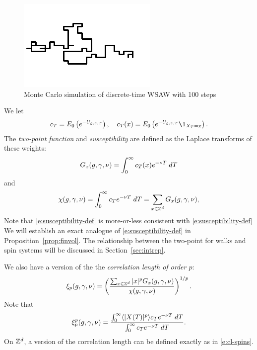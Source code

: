 \begin{figure}[!htb]
\centering
\label{fig:domb-joyce}
\includegraphics{domb-joyce-black-small.png}
\caption[Discrete WSAW]{Monte Carlo simulation of discrete-time WSAW with 100 steps}
\end{figure}

We let
\begin{equation}
\label{e:c}
c_T = E_0\left(e^{-U_{\gcc,\gamma,T}}\right),
	\quad
c_T(x) = E_0\left(e^{-U_{\gcc,\gamma,T}}\1_{X_T = x}\right).
\end{equation}
The \emph{two-point function} and \emph{susceptibility} are defined
as the Laplace transforms of these weights:
\begin{equation}
\lbeq{Gsa}
G_x(\gcc,\gamma,\nu)
    =
\int_0^\infty c_T(x) e^{-\nu T} \; dT
\end{equation}
and
\begin{equation}
\label{e:suscept-def}
\chi(g, \gamma, \nu)
	=
\int_0^\infty c_T e^{-\nu T} \; dT
	=
\sum_{x\in{ {{\mathbb Z}}^d }} G_x(g,\gamma,\nu),
\end{equation}
Note that \eqref{e:susceptibility-def} is more-or-less consistent with \eqref{e:susceptibility-def}
We will establish an exact analogue of \eqref{e:susceptibility-def} in Proposition~\ref{prop:finvol}.
The relationship between the two-point for walks and spin systems will be
discussed in Section~\ref{sec:intrep}.

We also have a version of the the \emph{correlation length of order $p$}:
\begin{equation}
\label{e:clp-wsawsa}
\xi_p(g, \gamma, \nu)
	=
\left(\frac{\sum_{x\in{ {{\mathbb Z}}^d }} |x|^p G_x(g, \gamma, \nu)}{\chi(g, \gamma, \nu)}\right)^{1/p}.
\end{equation}
Note that
\begin{equation}
\xi_p^p(g,\gamma,\nu)
	=
\frac
{\int_0^\infty \langle |X(T)|^p \rangle c_T e^{-\nu T} \; dT}
{\int_0^\infty c_T e^{-\nu T} \; dT}.
\end{equation}
On ${ {{\mathbb Z}}^d }$, a version of the correlation length can be defined exactly as in \eqref{e:cl-spins}.

